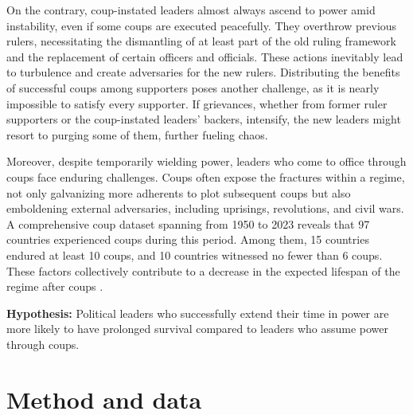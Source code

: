 \documentclass[
  12pt,
  a4paper,
  12pt]{article}
\begin{document}
On the contrary, coup-instated leaders almost always ascend to power
amid instability, even if some coups are executed peacefully. They
overthrow previous rulers, necessitating the dismantling of at least
part of the old ruling framework and the replacement of certain officers
and officials. These actions inevitably lead to turbulence and create
adversaries for the new rulers. Distributing the benefits of successful
coups among supporters poses another challenge, as it is nearly
impossible to satisfy every supporter. If grievances, whether from
former ruler supporters or the coup-instated leaders' backers,
intensify, the new leaders might resort to purging some of them, further
fueling chaos.

Moreover, despite temporarily wielding power, leaders who come to office
through coups face enduring challenges. Coups often expose the fractures
within a regime, not only galvanizing more adherents to plot subsequent
coups but also emboldening external adversaries, including uprisings,
revolutions, and civil wars. A comprehensive coup dataset
\citep{powell2011} spanning from 1950 to 2023 reveals that 97 countries
experienced coups during this period. Among them, 15 countries endured
at least 10 coups, and 10 countries witnessed no fewer than 6 coups.
These factors collectively contribute to a decrease in the expected
lifespan of the regime after coups \citep{dahl2023}.

\textbf{Hypothesis:} Political leaders who successfully extend their
time in power are more likely to have prolonged survival compared to
leaders who assume power through coups.

\hypertarget{method-and-data}{%
\section{Method and data}\label{method-and-data}}

\newpage


\renewcommand\refname{References}
  
\end{document}
